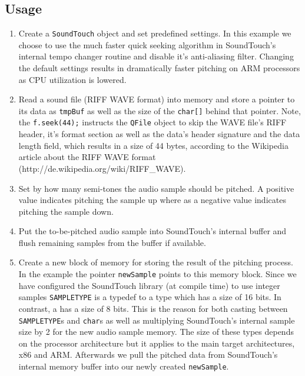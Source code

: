 \subsection{Usage}
\begin{enumerate}
\item Create a {\tt SoundTouch} object and set predefined settings. In this example we choose to use the much faster quick seeking algorithm in SoundTouch's internal tempo changer routine and disable it's anti-aliasing filter. Changing the default settings results in dramatically faster pitching on ARM processors as CPU utilization is lowered.
\item Read a sound file (RIFF WAVE format) into memory and store a pointer to its data as {\tt tmpBuf} as well as the size of the {\tt char[]} behind that pointer. Note, the {\tt f.seek(44);} instructs the {\tt QFile} object to skip the WAVE file's RIFF header, it's format section as well as the data's header signature and the data length field, which results in a size of 44 bytes, according to the Wikipedia article about the RIFF WAVE format (http://de.wikipedia.org/wiki/RIFF\_WAVE).
\item Set by how many semi-tones the audio sample should be pitched. A positive value indicates pitching the sample up where as a negative value indicates pitching the sample down.
\item Put the to-be-pitched audio sample into SoundTouch's internal buffer and flush remaining samples from the buffer if available.
\item Create a new block of memory for storing the result of the pitching process. In the example the pointer {\tt newSample} points to this memory block. Since we have configured the SoundTouch library (at compile time) to use integer samples {\tt SAMPLETYPE} is a typedef to a  type which has a size of 16 bits. In contrast, a  has a size of 8 bits. This is the reason for both casting between {\tt SAMPLETYPE}s and {\tt char}s as well as multiplying SoundTouch's internal sample size by 2 for the new audio sample memory. The size of these types depends on the processor architecture but it applies to the main target architectures, x86 and ARM. Afterwards we pull the pitched data from SoundTouch's internal memory buffer into our newly created {\tt newSample}.
\end{enumerate}

